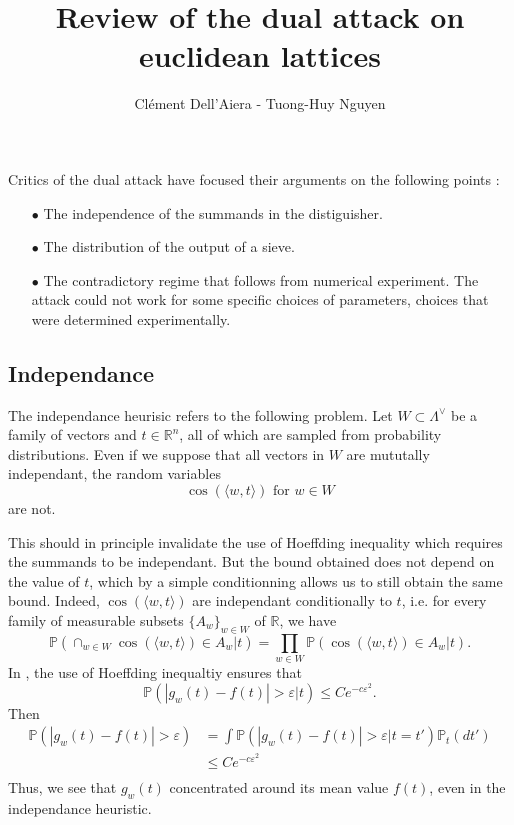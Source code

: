 \documentclass{article}
\title{Review of the dual attack on euclidean lattices}
\author{Clément Dell'Aiera - Tuong-Huy Nguyen}
\begin{document}
\maketitle
Critics of the dual attack have focused their arguments on the following points :
\begin{itemize}
\item[$\bullet$] The independence of the summands in the distiguisher.
\item[$\bullet$] The distribution of the output of a sieve.
\item[$\bullet$] The contradictory regime that follows from numerical experiment. The attack could not work for some specific choices of parameters, choices that were determined experimentally.
\end{itemize}

\subsection{Independance}

The independance heurisic refers to the following problem. Let $W\subset  \Lambda^\vee$ be a family of vectors and $t\in \mathbb R^n$, all of which are sampled from probability distributions. Even if we suppose that all vectors in $W$ are mututally independant, the random variables 
\[\cos (\langle w ,t \rangle) \text{ for }w\in W\]
are not. 

This should in principle invalidate the use of Hoeffding inequality which requires the summands to be independant. But the bound obtained does not depend on the value of $t$, which by a simple conditionning allows us to still obtain the same bound. Indeed, $\cos (\langle w ,t \rangle)$ are independant conditionally to $t$, i.e. for every family of measurable subsets $\{A_w\}_{w\in W}$ of $\mathbb R$, we have
\[ \mathbb P(\cap_{w\in W} \cos (\langle w ,t \rangle) \in A_w | t) =\prod_{w\in W} \mathbb P(\cos (\langle w ,t \rangle) \in A_w | t) .\] 
In \cite{PoulyShen}, the use of Hoeffding inequaltiy ensures that
\[\mathbb P(|g_w(t)-f(t)| > \varepsilon |t) \leq Ce^{-c\varepsilon^2}.\]
Then 
\[\begin{split}
\mathbb P(|g_w(t)-f(t)| > \varepsilon ) & =\int \mathbb P(|g_w(t)-f(t)| > \varepsilon |t = t')\mathbb P_t(dt') \\
		& \leq Ce^{-c\varepsilon^2}\\
\end{split}\]
Thus, we see that $g_w(t)$ concentrated around its mean value $f(t)$, even in the independance heuristic.
\end{document}
